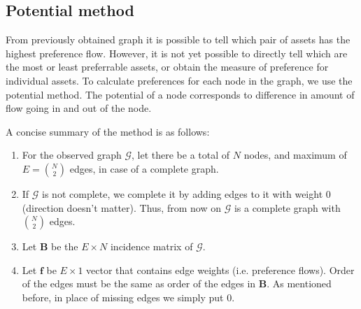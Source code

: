 \documentclass[letterpaper, 10 pt, conference]{ieeeconf}
\newcommand{\matr}[1]{\mathbold{#1}}
\newcommand{\graph}[1]{\mathcal{#1}}
\begin{document}
  \subsection{Potential method}
  \label{sub:potential}
  From previously obtained graph it is possible to tell which pair of assets has the highest preference flow.
  However, it is not yet possible to directly tell which are the most or least preferrable assets, or obtain the measure of preference for individual assets.
  To calculate preferences for each node in the graph, we use the potential method\cite{caklovic}.
  The potential of a node corresponds to difference in amount of flow going in and out of the node.
  
  A concise summary of the method is as follows:
  \begin{enumerate}
    \item For the observed graph $\graph{G}$, let there be a total of $N$ nodes, and maximum of $E = \binom{N}{2}$ edges, in case of a complete graph.
    
    \item If $\graph{G}$ is not complete, we complete it by adding edges to it with weight 0 (direction doesn't matter).
    Thus, from now on $\graph{G}$ is a complete graph with $\binom{N}{2}$ edges.
    
    \item Let $\matr{B}$ be the $E \times N$ incidence matrix of $\graph{G}$.

    \item Let $\matr{f}$ be $E \times 1$ vector that contains edge weights (i.e. preference flows).
    Order of the edges must be the same as order of the edges in $\matr{B}$.
    As mentioned before, in place of missing edges we simply put 0.
    

\end{enumerate}
\end{document}
